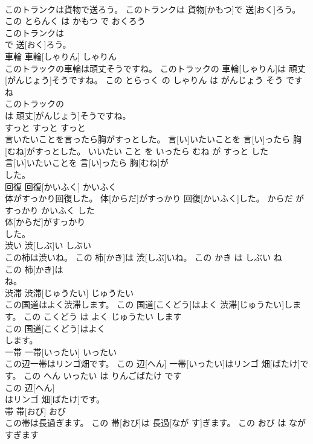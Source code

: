 \documentclass[8pt]{extreport}
\begin{document}
\begin{CJK}{UTF8}{min}
\\	このトランクは貨物で送ろう。	このトランクは 貨物[かもつ]で 送[おく]ろう。	この とらんく は かもつ で おくろう	
\\	このトランクは
\\	で 送[おく]ろう。			
\\	車輪	車輪[しゃりん]	しゃりん	
\\	このトラックの車輪は頑丈そうですね。	このトラックの 車輪[しゃりん]は 頑丈[がんじょう]そうですね。	この とらっく の しゃりん は がんじょう そう です ね	
\\	このトラックの
\\	は 頑丈[がんじょう]そうですね。			
\\	すっと	すっと	すっと	
\\	言いたいことを言ったら胸がすっとした。	言[い]いたいことを 言[い]ったら 胸[むね]がすっとした。	いいたい こと を いったら むね が すっと した	
\\	言[い]いたいことを 言[い]ったら 胸[むね]が
\\	した。			
\\	回復	回復[かいふく]	かいふく	
\\	体がすっかり回復した。	体[からだ]がすっかり 回復[かいふく]した。	からだ が すっかり かいふく した	
\\	体[からだ]がすっかり
\\	した。			
\\	渋い	渋[しぶ]い	しぶい	
\\	この柿は渋いね。	この 柿[かき]は 渋[しぶ]いね。	この かき は しぶい ね	
\\	この 柿[かき]は
\\	ね。			
\\	渋滞	渋滞[じゅうたい]	じゅうたい	
\\	この国道はよく渋滞します。	この 国道[こくどう]はよく 渋滞[じゅうたい]します。	この こくどう は よく じゅうたい します	
\\	この 国道[こくどう]はよく
\\	します。			
\\	一帯	一帯[いったい]	いったい	
\\	この辺一帯はリンゴ畑です。	この 辺[へん] 一帯[いったい]はリンゴ 畑[ばたけ]です。	この へん いったい は りんごばたけ です	
\\	この 辺[へん]
\\	はリンゴ 畑[ばたけ]です。			
\\	帯	帯[おび]	おび	
\\	この帯は長過ぎます。	この 帯[おび]は 長過[なが す]ぎます。	この おび は なが すぎます	

\end{CJK}
\end{document}
